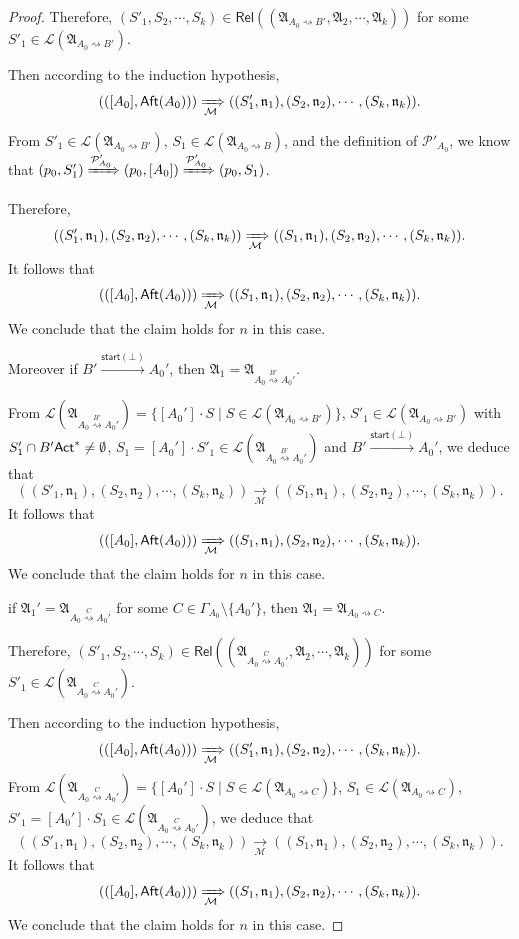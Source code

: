 \documentclass[preprint,12pt]{elsarticle}
\newcommand\Mm{{\mathcal{M} }}
\newcommand\Pp{{\mathcal{P} }}
\newcommand\act{{\sf Act}}
\newcommand\aft{{\sf Aft}}
\newcommand\startactivity{{\mathsf{start} }}
\newcommand\aname{\mathfrak{n}}
\newcommand\Rel{\mathsf{Rel}}
\newcommand\Aut{{\mathfrak{A} }}
\newcommand\Lang{{\mathscr{L} }}
\begin{document}
\begin{proof}
{Therefore, $(S'_1, S_2, \cdots, S_k) \in \Rel((\Aut_{A_0\rightsquigarrow B'}, \Aut_2, \cdots, \Aut_k))$ for some $S'_1 \in \Lang(\Aut_{A_0\rightsquigarrow B'})$. 

Then according to the induction hypothesis, 
$$(([A_0], \aft(A_0))) \xRightarrow[\Mm]{} ((S'_1, \aname_1), (S_2, \aname_2), \cdots, (S_k, \aname_k)).$$

From $S'_1 \in \Lang(\Aut_{A_0\rightsquigarrow B'})$, $S_1 \in \Lang(\Aut_{A_0\rightsquigarrow B})$, and the definition of $\Pp'_{A_0}$, we know that $(p_0, S'_1) \xRightarrow{\Pp'_{A_0}} (p_0, [A_0]) \xRightarrow{\Pp'_{A_0}} (p_0, S_1)$. 

Therefore, 
$$((S'_1, \aname_1), (S_2, \aname_2), \cdots, (S_k, \aname_k)) \xRightarrow[\Mm]{} ((S_1, \aname_1), (S_2, \aname_2), \cdots, (S_k, \aname_k)).$$
It follows that 
$$(([A_0], \aft(A_0))) \xRightarrow[\Mm]{} ((S_1, \aname_1), (S_2, \aname_2), \cdots, (S_k, \aname_k)).$$
We conclude that the claim holds for $n$ in this case. 

Moreover if $B'\xrightarrow{\startactivity(\bot)}A_0'$, then $\Aut_1 = \Aut_{A_0\stackrel{B'}\rightsquigarrow A_0'}$.

From $\Lang(\Aut_{A_0\stackrel{B'}\rightsquigarrow A_0'}) = \{[A_0']\cdot S\mid S \in \Lang(\Aut_{A_0\rightsquigarrow B'})\}$, $S'_1 \in \Lang(\Aut_{A_0\rightsquigarrow B'})$ with $S'_1\cap B'\act^* \neq \emptyset$, $S_1 = [A_0']\cdot S'_1 \in \Lang(\Aut_{A_0\stackrel{B'}\rightsquigarrow A_0'})$ and $B'\xrightarrow{\startactivity(\bot)}A_0'$, we deduce that
$$((S'_1, \aname_1), (S_2, \aname_2), \cdots, (S_k, \aname_k)) \xrightarrow[\Mm]{} ((S_1, \aname_1), (S_2, \aname_2), \cdots, (S_k, \aname_k)).$$
It follows that 
$$(([A_0], \aft(A_0))) \xRightarrow[\Mm]{} ((S_1, \aname_1), (S_2, \aname_2), \cdots, (S_k, \aname_k)).$$
We conclude that the claim holds for $n$ in this case. 
    \item if $\Aut_1' = \Aut_{A_0\stackrel{C}\rightsquigarrow A_0'}$ for some $C\in\Gamma_{A_0}\setminus\{A_0'\}$, then $\Aut_1 = \Aut_{A_0\rightsquigarrow C}$.

Therefore, $(S'_1, S_2, \cdots, S_k) \in \Rel((\Aut_{A_0\stackrel{C}\rightsquigarrow A_0'}, \Aut_2, \cdots, \Aut_k))$ for some $S'_1 \in \Lang(\Aut_{A_0\stackrel{C}\rightsquigarrow A_0'})$. 

Then according to the induction hypothesis, 
$$(([A_0], \aft(A_0))) \xRightarrow[\Mm]{} ((S'_1, \aname_1), (S_2, \aname_2), \cdots, (S_k, \aname_k)).$$
From $\Lang(\Aut_{A_0\stackrel{C}\rightsquigarrow A_0'}) = \{[A_0']\cdot S\mid S \in \Lang(\Aut_{A_0\rightsquigarrow C})\}$,  $S_1\in\Lang(\Aut_{A_0\rightsquigarrow C})$, $S'_1 = [A_0']\cdot S_1\in\Lang(\Aut_{A_0\stackrel{C}\rightsquigarrow A_0'})$, we deduce that
$$((S'_1, \aname_1), (S_2, \aname_2), \cdots, (S_k, \aname_k)) \xrightarrow[\Mm]{} ((S_1, \aname_1), (S_2, \aname_2), \cdots, (S_k, \aname_k)).$$
It follows that 
$$(([A_0], \aft(A_0))) \xRightarrow[\Mm]{} ((S_1, \aname_1), (S_2, \aname_2), \cdots, (S_k, \aname_k)).$$
We conclude that the claim holds for $n$ in this case. 

}
\end{proof}
\end{document}
